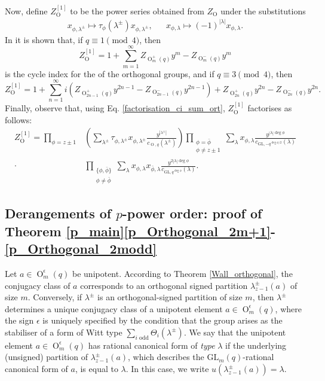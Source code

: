 \documentclass[a4paper, 12pt, oneside]{amsart}
\theoremstyle{definition}
\newcommand{\GL}{\mathrm{GL}}
\DeclareMathOperator{\Or}{O}
\begin{document}
Now, define $Z_{\Or}^{[1]}$ to be the power series obtained from $Z_{\Or}$ under the substitutions
\begin{align}
x_{\phi, \lambda^{\pm}}\mapsto \tau_{\phi}(\lambda^{\pm})x_{\phi, \lambda^{\pm}},&& x_{\phi, \lambda} \mapsto (-1)^{|\lambda|}x_{\phi,\lambda}.
\end{align}
In \cite[p. 580]{Britnell_difference_orth} it is shown that, if $q \equiv 1 \pmod 4$, then
\begin{equation}
Z_{\Or}^{[1]}=1+\sum_{m=1}^{\infty} Z_{\Or^{+}_{m}(q)}y^m-Z_{\Or^{-}_{m}(q)}y^m
\end{equation}
is the cycle index for the  of the orthogonal groups, and if $q \equiv 3 \pmod 4$, then
\begin{equation}
Z_{\Or}^{[1]}=1+\sum_{n=1}^{\infty}i(Z_{\Or^{+}_{2n-1}(q)}y^{2n-1}-Z_{\Or^{-}_{2n-1}(q)}y^{2n-1})+Z_{\Or^{+}_{2n}(q)}y^{2n}-Z_{\Or^{-}_{2n}(q)}y^{2n}.
\end{equation}
Finally, observe that, using Eq. \eqref{factorisation_ci_sum_ort}, $Z^{[1]}_{\Or}$ factorises as follows:
\begin{align}
\label{factorisation_ci_difference_ort}
Z^{[1]}_{\Or}=\prod_{\phi=z\pm1}&\left(\sum_{\lambda^{\pm}}\tau_{\phi,\lambda^{\pm}}
x_{\phi,\lambda^{\pm}}\frac{y^{|\lambda^{\pm}|}}{c_{\Or,q}(\lambda^{\pm})}\right)\prod_{\substack{\phi=\bar{\phi}\\\phi \neq z\pm1}}\sum_{\lambda}x_{\phi,\lambda}\frac{y^{|\lambda|\deg \phi}}{c_{\GL,-q^{\deg \phi/2}}(\lambda)} \nonumber \nonumber \\
\cdot&
\prod_{\substack{\{\phi,\bar{\phi}\}\\\phi \neq \bar{\phi}}}\sum_{\lambda}x_{\phi,\lambda}x_{\bar{\phi},\lambda}
\frac{y^{2|\lambda|\deg \phi}}{c_{\GL,q^{\deg \phi}}(\lambda)}.
\end{align}

\subsection{Derangements of $p$-power order: proof of Theorem \ref{p_main}\eqref{p_Orthogonal_2m+1}-\eqref{p_Orthogonal_2modd}}
Let $a \in \Or^{\epsilon}_{m}(q)$ be unipotent. According to Theorem \ref{Wall_orthogonal}, the conjugacy class of $a$ corresponds to an orthogonal signed  partition $\lambda^{\pm}_{z-1}(a)$ of size $m$. Conversely, if $\lambda^{\pm}$ is an orthogonal-signed partition of size $m$, then $\lambda^{\pm}$ determines a unique conjugacy class of a unipotent element $a \in \Or^{\epsilon}_{m}(q)$, where the sign $\epsilon$ is uniquely specified by the condition that the group arises as the stabiliser of a form of Witt type
$\sum_{i\text{ odd}}\Theta_i(\lambda^{\pm}).$
We say that the unipotent element $a \in \Or^{\epsilon}_{m}(q)$ has rational canonical form of \textit{type} $\lambda$ if the underlying (unsigned) partition of $\lambda^{\pm}_{z-1}(a)$, which describes the $\GL_{m}(q)$-rational canonical form of $a$,
is equal to $\lambda$. In this case, we write $u(\lambda^{\pm}_{z-1}(a))=\lambda$.
\end{document}
